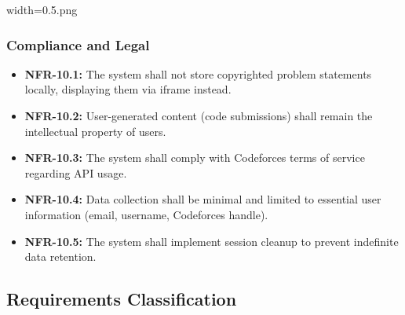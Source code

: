 width=0.5\linewidthimage.png\documentclass[12pt,a4paper]{article}
\begin{document}
\subsubsection{Compliance and Legal}
\begin{itemize}
\item \textbf{NFR-10.1:} The system shall not store copyrighted problem statements locally, displaying them via iframe instead.
\item \textbf{NFR-10.2:} User-generated content (code submissions) shall remain the intellectual property of users.
\item \textbf{NFR-10.3:} The system shall comply with Codeforces terms of service regarding API usage.
\item \textbf{NFR-10.4:} Data collection shall be minimal and limited to essential user information (email, username, Codeforces handle).
\item \textbf{NFR-10.5:} The system shall implement session cleanup to prevent indefinite data retention.
\end{itemize}

\subsection{Requirements Classification}
\end{document}
